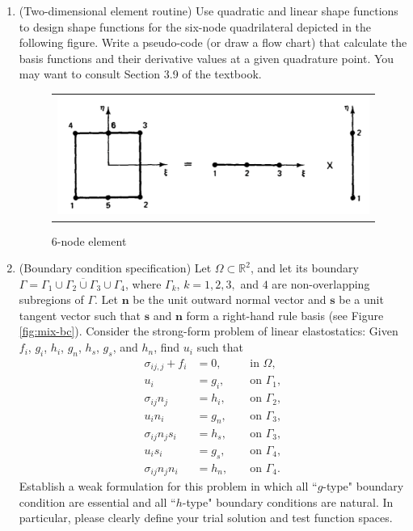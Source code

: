 \documentclass[12pt]{article}
\begin{document}
\begin{enumerate}
\item (Two-dimensional element routine) Use quadratic and linear shape functions to design shape functions for the six-node quadrilateral depicted in the following figure. Write a pseudo-code (or draw a flow chart) that calculate the basis functions and their derivative values at a given quadrature point. You may want to consult Section 3.9 of the textbook.

\begin{figure}[h]
	\begin{center}
	\begin{tabular}{c}
\includegraphics[angle=0, trim=0 0 0 0, clip=true, scale = 0.35]{./6node-elem.pdf}
\end{tabular}
\end{center} 
\caption{6-node element}
\label{fig:quad_elem}
\end{figure}

\item(Boundary condition specification) Let $\Omega \subset \mathbb R^2$, and let its boundary $\Gamma = \overline{\Gamma_1 \cup \Gamma_2\cup \Gamma_3 \cup \Gamma_4}$, where $\Gamma_k$, $k=1,2,3,$ and $4$ are non-overlapping subregions of $\Gamma$. Let $\bm n$ be the unit outward normal vector and $\bm s$ be a unit tangent vector such that $\bm s$ and $\bm n$ form a right-hand rule basis (see Figure \ref{fig:mix-bc}). Consider the strong-form problem of linear elastostatics: Given $f_i$, $g_i$, $h_i$, $g_n$, $h_s$, $g_s$, and $h_n$, find $u_i$ such that
\begin{align*}
\sigma_{ij,j} + f_i &= 0, && \mbox{ in } \Omega, \\
u_i &= g_i, && \mbox{ on } \Gamma_1, \\
\sigma_{ij}n_j &= h_i, &&\mbox{ on } \Gamma_2,\\
u_i n_i &= g_n, && \mbox{ on } \Gamma_3, \\
\sigma_{ij}n_js_i &= h_s, && \mbox{ on } \Gamma_3, \\
u_i s_i &= g_s, && \mbox{ on } \Gamma_4, \\
\sigma_{ij}n_jn_i &= h_n, && \mbox{ on } \Gamma_4.
\end{align*} 
Establish a weak formulation for this problem in which all ``$g$-type" boundary condition are essential and all ``$h$-type" boundary conditions are natural. In particular, please clearly define your trial solution and test function spaces.


\end{enumerate}
\end{document}
